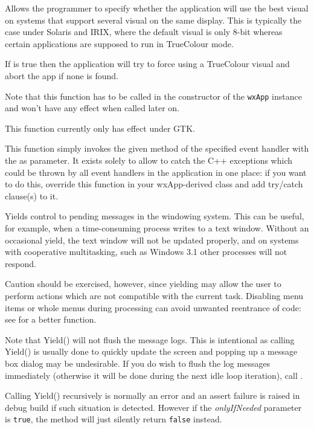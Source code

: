
Allows the programmer to specify whether the application will use the best visual
on systems that support several visual on the same display. This is typically the
case under Solaris and IRIX, where the default visual is only 8-bit whereas certain
applications are supposed to run in TrueColour mode.

If  is true then the application will try to force
using a TrueColour visual and abort the app if none is found.

Note that this function has to be called in the constructor of the {\tt wxApp} 
instance and won't have any effect when called later on.

This function currently only has effect under GTK.




\label{wxapphandleevent}


This function simply invokes the given method  of the specified
event handler  with the  as parameter. It exists solely
to allow to catch the C++ exceptions which could be thrown by all event
handlers in the application in one place: if you want to do this, override this
function in your wxApp-derived class and add try/catch clause(s) to it.


\label{wxappyield}


Yields control to pending messages in the windowing system. This can be useful, for example, when a
time-consuming process writes to a text window. Without an occasional
yield, the text window will not be updated properly, and on systems with
cooperative multitasking, such as Windows 3.1 other processes will not respond.

Caution should be exercised, however, since yielding may allow the
user to perform actions which are not compatible with the current task.
Disabling menu items or whole menus during processing can avoid unwanted
reentrance of code: see  for a better
function.

Note that Yield() will not flush the message logs. This is intentional as
calling Yield() is usually done to quickly update the screen and popping up a
message box dialog may be undesirable. If you do wish to flush the log
messages immediately (otherwise it will be done during the next idle loop
iteration), call .

Calling Yield() recursively is normally an error and an assert failure is
raised in debug build if such situation is detected. However if the 
{\it onlyIfNeeded} parameter is {\tt true}, the method will just silently
return {\tt false} instead.

